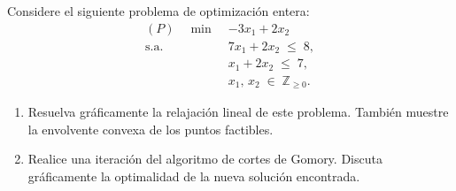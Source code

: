 Considere el siguiente problema de optimización entera:
\[
\begin{aligned}
(P)\quad \min\;& -3x_{1} + 2x_{2}\\
\text{s.a.}\quad
&7x_{1} + 2x_{2} \;\le\; 8,\\
&x_{1} + 2x_{2} \;\le\; 7,\\
&x_{1},\,x_{2}\;\in\;\mathbb{Z}_{\ge0}.
\end{aligned}
\]

\begin{enumerate}
  \item Resuelva gráficamente la relajación lineal de este problema. También muestre la envolvente convexa de los puntos factibles.
  \item Realice una iteración del algoritmo de cortes de Gomory. Discuta gráficamente la optimalidad de la nueva solución encontrada.
\end{enumerate}
